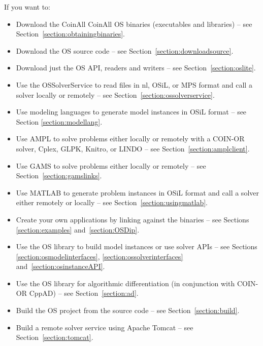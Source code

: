 \label{section:roadmap}

If you want to:

\begin{itemize}
\item Download the 
\ifruncode CoinAll
   \ifuselibs CoinAll
   \else OS \fi
\fi
binaries  (executables and libraries) -- see Section~\ref{section:obtainingbinaries}.

\ifdevelop
\item Download the OS source code -- see Section~\ref{section:downloadsource}.

\item Download just the OS API, readers and writers -- see Section~\ref{section:oslite}.
\fi

\item Use the OSSolverService to read files in nl, OSiL, 
or MPS format and call a solver locally or remotely -- see Section~\ref{section:ossolverservice}.

\item Use modeling languages to generate model instances in OSiL format -- see Section \ref{section:modellang}.

\item Use AMPL to solve problems either locally or remotely
with a COIN-OR solver, Cplex,
GLPK, \ifknitro Knitro, \fi
or LINDO -- see Section~\ref{section:amplclient}.

\item Use GAMS to solve problems either locally or remotely -- see Section~\ref{section:gamslinks}.

\ifruncode\else
\item Use MATLAB to generate problem instances in OSiL format 
and call a solver either remotely or locally -- see Section~\ref{section:usingmatlab}.

\item Create your own applications by linking against the binaries -- see Sections \ref{section:examples} and~\ref{section:OSDip}.

\item Use the OS library to build model instances or use solver APIs -- see Sections \ref{section:osmodelinterfaces},
\ref{section:ossolverinterfaces} and~\ref{section:osinstanceAPI}.

\item Use the OS library for algorithmic differentiation (in conjunction with 
COIN-OR CppAD) -- see Section~\ref{section:ad}.

 
\ifuselibs\else
\item Build the OS project from the source code -- see Section~\ref{section:build}.
\fi
\fi

\ifdevelop
\item Build a remote solver service using Apache Tomcat -- see Section~\ref{section:tomcat}.
\fi
\end{itemize}

